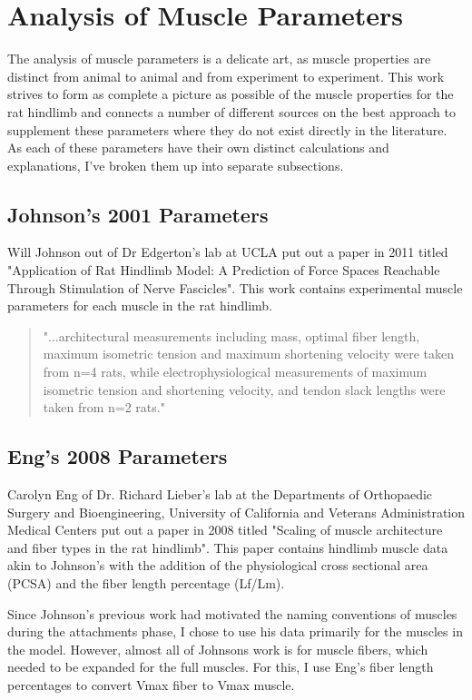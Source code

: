 \documentclass[runningheads,a4paper]{llncs}
\begin{document}
	\section{Analysis of Muscle Parameters}
	The analysis of muscle parameters is a delicate art, as muscle properties are distinct from animal to animal and from experiment to experiment. This work strives to form as complete a picture as possible of the muscle properties for the rat hindlimb and connects a number of different sources on the best approach to supplement these  parameters where they do not exist directly in the literature. As each of these parameters have their own distinct calculations and explanations, I've broken them up into separate subsections.
	\subsection{Johnson's 2001 Parameters}
	Will Johnson out of Dr Edgerton's lab at UCLA put out a paper in 2011 titled "Application of Rat Hindlimb Model: A Prediction of Force Spaces Reachable Through Stimulation of Nerve Fascicles".\cite{johnson_application_2011} This work contains experimental muscle parameters for each muscle in the rat hindlimb. 
	\begin{quote}
	 "...architectural measurements including mass, optimal fiber length, maximum isometric tension and maximum shortening velocity were taken from n=4 rats, while electrophysiological measurements of maximum isometric tension and shortening velocity, and tendon slack lengths were taken from n=2 rats."
	\end{quote} \par
	\subsection{Eng's 2008 Parameters}
	Carolyn Eng of Dr. Richard Lieber's lab at the Departments of Orthopaedic Surgery and Bioengineering, University of California and Veterans Administration Medical Centers put out a paper in 2008 titled "Scaling of muscle architecture and fiber types in the rat hindlimb". This paper contains hindlimb muscle data akin to Johnson's with the addition of the physiological cross sectional area (PCSA) and the fiber length percentage (Lf/Lm). \par
	Since Johnson's previous work had motivated the naming conventions of muscles during the attachments phase, I chose to use his data primarily for the muscles in the model. However, almost all of Johnsons work is for muscle fibers, which needed to be expanded for the full muscles. For this, I use Eng's fiber length percentages to convert Vmax fiber to Vmax muscle.
\end{document}
